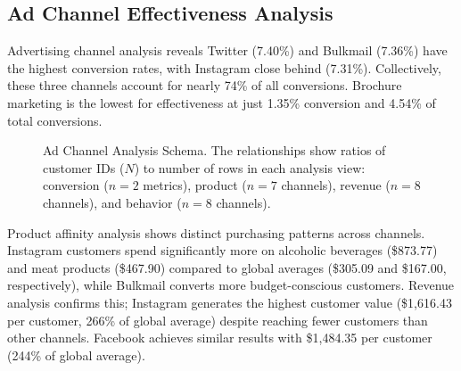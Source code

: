 \documentclass[12pt,a4paper]{article}
\begin{document}
\subsection{Ad Channel Effectiveness Analysis}
Advertising channel analysis reveals Twitter (7.40\%) and Bulkmail (7.36\%) have the highest conversion rates, with Instagram close behind (7.31\%). Collectively, these three channels account for nearly 74\% of all conversions. Brochure marketing is the lowest for effectiveness at just 1.35\% conversion and 4.54\% of total conversions.
\begin{figure}[h!]
\centering
{}
\caption{Ad Channel Analysis Schema. The relationships show ratios of customer IDs ($N$) to number of rows in each analysis view: conversion ($n=2$ metrics), product ($n=7$ channels), revenue ($n=8$ channels), and behavior ($n=8$ channels).}
\label{fig:ad-channel-schema}
\end{figure}
\FloatBarrier
\noindent Product affinity analysis shows distinct purchasing patterns across channels. Instagram customers spend significantly more on alcoholic beverages (\$873.77) and meat products (\$467.90) compared to global averages (\$305.09 and \$167.00, respectively), while Bulkmail converts more budget-conscious customers. Revenue analysis confirms this; Instagram generates the highest customer value (\$1,616.43 per customer, 266\% of global average) despite reaching fewer customers than other channels. Facebook achieves similar results with \$1,484.35 per customer (244\% of global average).\\
\end{document}
